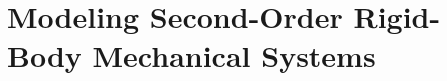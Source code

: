 \chapter{Modeling Second-Order Rigid-Body Mechanical Systems}
\label{chModels}

\acresetall






%







%